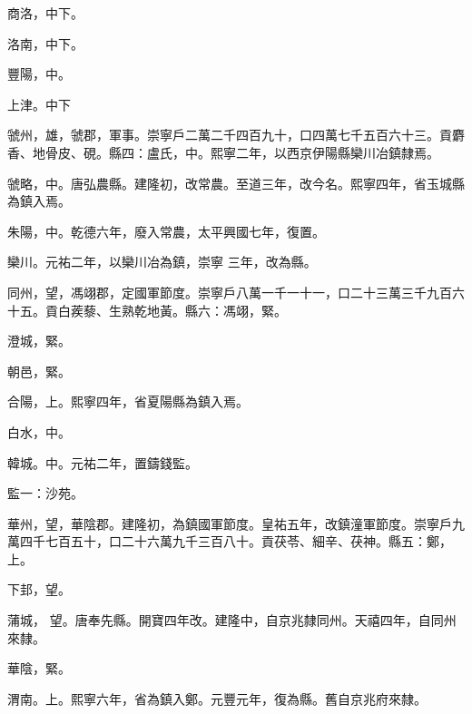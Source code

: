 \begin{pinyinscope}
 商洛，中下。



 洛南，中下。



 豐陽，中。



 上津。中下



 虢州，雄，虢郡，軍事。崇寧戶二萬二千四百九十，口四萬七千五百六十三。貢麝香、地骨皮、硯。縣四：盧氏，中。熙寧二年，以西京伊陽縣欒川冶鎮隸焉。



 虢略，中。唐弘農縣。建隆初，改常農。至道三年，改今名。熙寧四年，省玉城縣為鎮入焉。



 朱陽，中。乾德六年，廢入常農，太平興國七年，復置。



 欒川。元祐二年，以欒川冶為鎮，崇寧
 三年，改為縣。



 同州，望，馮翊郡，定國軍節度。崇寧戶八萬一千一十一，口二十三萬三千九百六十五。貢白蒺藜、生熟乾地黃。縣六：馮翊，緊。



 澄城，緊。



 朝邑，緊。



 合陽，上。熙寧四年，省夏陽縣為鎮入焉。



 白水，中。



 韓城。中。元祐二年，置鑄錢監。



 監一：沙苑。



 華州，望，華陰郡。建隆初，為鎮國軍節度。皇祐五年，改鎮潼軍節度。崇寧戶九萬四千七百五十，口二十六萬九千三百八十。貢茯苓、細辛、茯神。縣五：鄭，上。



 下邽，望。



 蒲城，
 望。唐奉先縣。開寶四年改。建隆中，自京兆隸同州。天禧四年，自同州來隸。



 華陰，緊。



 渭南。上。熙寧六年，省為鎮入鄭。元豐元年，復為縣。舊自京兆府來隸。




\end{pinyinscope}
